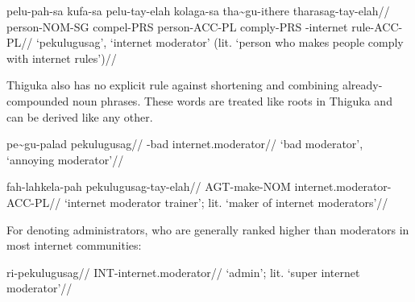 \ex
\begingl
\gla   pelu-pah-sa kufa-sa pelu-tay-elah kolaga-sa tha\~{}gu-ithere tharasag-tay-elah//
\glb   person-NOM-SG compel-PRS person-ACC-PL comply-PRS \agradj{}-internet rule-ACC-PL//
\glft  `pekulugusag', `internet moderator' (lit. `person who makes people comply with internet rules')//
\endgl
\xe

Thiguka also has no explicit rule against shortening and combining already-compounded noun phrases. These words are treated like roots in Thiguka and can be derived like any other.

\ex
\begingl
\gla   pe\~{}gu-palad pekulugusag//
\glb   \agradj{}-bad internet.moderator//
\glft  `bad moderator', `annoying moderator'//
\endgl
\xe

\ex
\begingl
\gla   fah-lahkela-pah pekulugusag-tay-elah//
\glb   AGT-make-NOM internet.moderator-ACC-PL//
\glft `internet moderator trainer'; lit. `maker of internet moderators'//
\endgl
\xe

For denoting administrators, who are generally ranked higher than moderators in most internet communities:

\ex
\begingl
\gla ri-pekulugusag//
\glb INT-internet.moderator//
\glft `admin'; lit. `super internet moderator'//
\endgl
\xe
